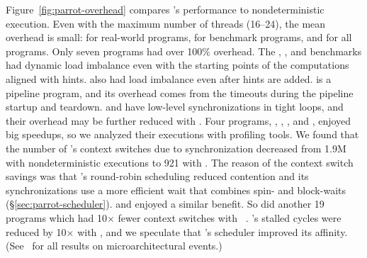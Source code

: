 Figure~\ref{fig:parrot-overhead} compares \parrot's performance to nondeterministic
execution.  Even with the maximum number of threads (16--24), the mean
overhead is small: \meanrealoverhead for real-world programs, \meanbenchoverhead for benchmark
programs, and \meanoverhead for all programs.
Only seven programs had over 100\% overhead.  The \ferret, \freqmine, and \is benchmarks
had dynamic load imbalance even with the starting points of the computations
aligned with \compute hints. \ua also had load 
imbalance even after \nondet hints are added.
\xtwosixfour is a pipeline program, and its overhead
comes from the \compute timeouts during the pipeline startup and
teardown.  \rtviewraytrace and \barnes have low-level
synchronizations in tight loops, and their overhead may be further reduced
with \nondets.  Four programs, \mencoder, \bodytrackopenmp, \facesim, and
\linearregrepthread, enjoyed big speedups, so we analyzed their 
executions with profiling tools. We found that the number of \mencoder's 
context switches due to synchronization decreased from 1.9M with
nondeterministic executions to 921 with \parrot.  The reason of the context
switch savings was that \parrot's round-robin scheduling reduced contention
and its synchronizations use a more efficient wait that combines spin- and
block-waits (\S\ref{sec:parrot-scheduler}).  \bodytrackopenmp and \facesim
enjoyed a similar benefit.  So did another 19 programs which had
10$\times$ fewer context switches with
\parrot~\cite{Parrot:github}. \linearregrepthread's stalled cycles were
reduced by 10$\times$ with \parrot, and we speculate that \parrot's scheduler
improved its affinity. (See~\cite{Parrot:github} for all results on
microarchitectural events.)




